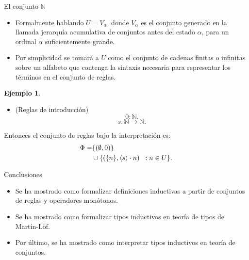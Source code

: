 \documentclass[dvipsnames, 8pt]{beamer} %
\theoremstyle{plain}
\newcommand{\N}{\mathbb{N}}
\theoremstyle{definition}
\newtheorem{ejemplo}{Ejemplo}
\begin{document}
\begin{frame}{El conjunto $\N$}
    \begin{itemize}
        \item Formalmente hablando $U = V_{\alpha}$, donde $V_\alpha$ es el conjunto generado en la llamada jerarquía acumulativa de conjuntos antes del estado $\alpha$, para un ordinal $\alpha$ suficientemente grande.\pause
        \item Por simplicidad se tomará a $U$ como el conjunto de cadenas finitas o infinitas sobre un alfabeto que contenga la sintaxis necesaria para representar los términos en el conjunto de reglas.\pause
    \end{itemize}
    \begin{ejemplo}
        \begin{itemize}
            \item (Reglas de introducción)\pause
                  $$0:\N.$$
                  $$s:\N\to\N.$$
        \end{itemize}\pause
        Entonces el conjunto de reglas bajo la interpretación es:\pause
        \begin{align*}
            \Phi = & \{(\emptyset, 0)\}\\
                   & \cup \{(\{n\}, \langle s\rangle\cdot n)\hspace{2mm}: n \in U\}
        .\end{align*}
    \end{ejemplo}
\end{frame}

\begin{frame}{Conclusiones}
    \begin{itemize}
        \item Se ha mostrado como formalizar definiciones inductivas a partir de conjuntos de reglas y operadores monótonos.\pause
        \item Se ha mostrado como formalizar tipos inductivos en teoría de tipos de Martín-Löf.\pause
        \item Por último, se ha mostrado como interpretar tipos inductivos en teoría de conjuntos.
    \end{itemize}
\end{frame}
\end{document}
